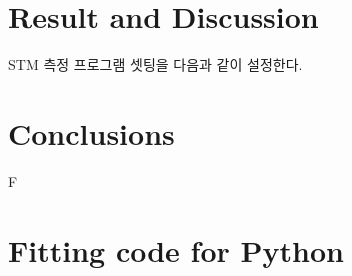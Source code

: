 \documentclass[a4paper, 10pt, nanum]{CSUniSchoolLabReport}
\begin{document}

\section{Result and Discussion}

	STM 측정 프로그램 셋팅을 다음과 같이 설정한다.
	
	\begin{table}[htb!]
		\label{tab:2}
		\centering
	\end{table}


\section{Conclusions}

	F


\section{Fitting code for Python}



\end{document}
